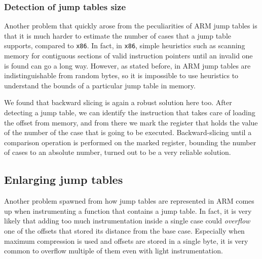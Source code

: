 \documentclass[a4paper,11pt,oneside]{report}
\begin{document}
\subsubsection{Detection of jump tables size}
Another problem that quickly arose from the peculiarities of ARM jump tables is 
that it is much harder to estimate the number of cases that a jump table 
supports, compared to \texttt{x86}. In fact, in \texttt{x86}, simple heuristics 
such as scanning memory for contiguous sections of valid instruction pointers 
until an invalid one is found can go a long way. However, as stated before, in 
ARM jump tables are indistinguishable from random bytes, so it is impossible to 
use heuristics to understand the bounds of a particular jump table in memory.

We found that backward slicing is again a robust solution here too. After 
detecting a jump table, we can identify the instruction that takes care of 
loading the offset from memory, and from there we mark the register that holds 
the value of the number of the case that is going to be executed.  
Backward-slicing until a comparison operation is performed on the marked 
register, bounding the number of cases to an absolute number, turned out to be 
a very reliable solution.  

\subsection{Enlarging jump tables}
Another problem spawned from how jump tables are represented in ARM comes up 
when instrumenting a function that contains a jump table. In fact, it is very 
likely that adding too much instrumentation inside a single case could 
\emph{overflow} one of the offsets that stored its distance from the base case.
Especially when maximum compression is used and offsets are stored in a single 
byte, it is very common to overflow multiple of them even with light 
instrumentation. 
\end{document}
